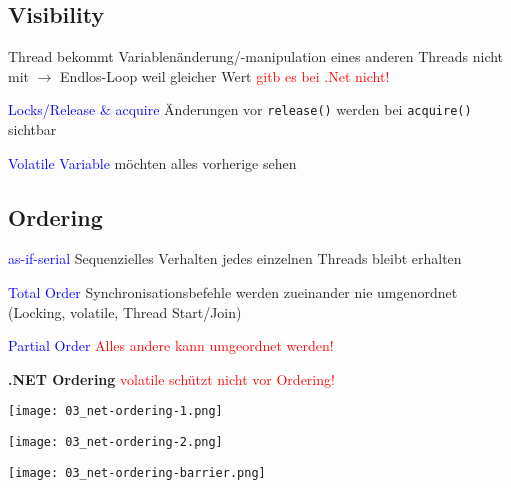 %
%

\subsection{Visibility}

Thread bekommt Variablenänderung/-manipulation eines anderen Threads nicht mit $\rightarrow$ Endlos-Loop weil gleicher Wert \textcolor{red}{gitb es bei .Net nicht!}

\textcolor{blue}{Locks/Release \& acquire} Änderungen vor \lstinline{release()} werden bei \lstinline{acquire()} sichtbar

\textcolor{blue}{Volatile Variable} möchten alles vorherige sehen

\subsection{Ordering}

\textcolor{blue}{as-if-serial} Sequenzielles Verhalten jedes einzelnen Threads bleibt erhalten

\textcolor{blue}{Total Order} Synchronisationsbefehle werden zueinander nie umgenordnet (Locking, volatile, Thread Start/Join)

\textcolor{blue}{Partial Order} \textcolor{red}{Alles andere kann umgeordnet werden!}

\textbf{.NET Ordering} \textcolor{red}{volatile schützt nicht vor Ordering!}

\begin{minipage}[t]{0.3\linewidth}
    \texttt{[image: 03\_net-ordering-1.png]}
\end{minipage}
\begin{minipage}[t]{0.3\linewidth}
    \texttt{[image: 03\_net-ordering-2.png]}
\end{minipage}
\begin{minipage}[t]{0.3\linewidth}
    \texttt{[image: 03\_net-ordering-barrier.png]}
\end{minipage}


